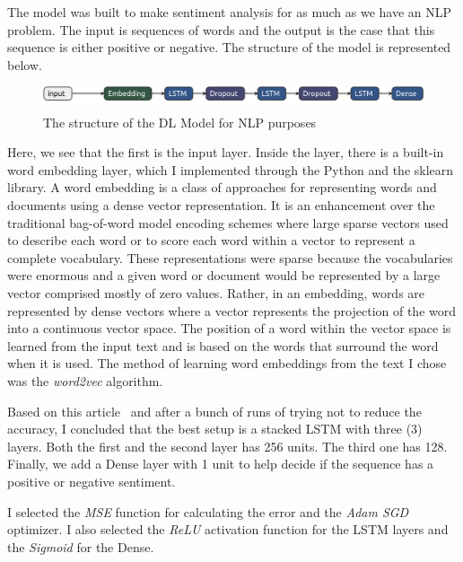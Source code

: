The model was built to make sentiment analysis for as much as we have an NLP problem.
The input is sequences of words and the output is the case that this sequence is either positive or negative.
The structure of the model is represented below.

\begin{figure}[H]
    \centering
    \includegraphics[scale=.3]{./images/impl/nlp-model.png}
    \caption{The structure of the DL Model for NLP purposes}
    \label{fig:dl_nlp_model}
\end{figure}

Here, we see that the first is the input layer.
Inside the layer, there is a built-in word embedding layer, which I implemented through the Python and the sklearn library.
A word embedding is a class of approaches for representing words and documents using a dense vector representation.
It is an enhancement over the traditional bag-of-word model encoding schemes where large sparse vectors used to describe each word or to score each word within a vector to represent a complete vocabulary.
These representations were sparse because the vocabularies were enormous and a given word or document would be represented by a large vector comprised mostly of zero values.
Rather, in an embedding, words are represented by dense vectors where a vector represents the projection of the word into a continuous vector space.
The position of a word within the vector space is learned from the input text and is based on the words that surround the word when it is used.
The method of learning word embeddings from the text I chose was the \emph{word2vec} algorithm.

Based on this article~\cite{rushabhwadkar_2019} and after a bunch of runs of trying not to reduce the accuracy, I concluded that the best setup is a stacked LSTM with three (3) layers.
Both the first and the second layer has 256 units.
The third one has 128.
Finally, we add a Dense layer with 1 unit to help decide if the sequence has a positive or negative sentiment.

I selected the \emph{MSE} function for calculating the error and the \emph{Adam SGD} optimizer.
I also selected the \emph{ReLU} activation function for the LSTM layers and the \emph{Sigmoid} for the Dense.

\newpage

